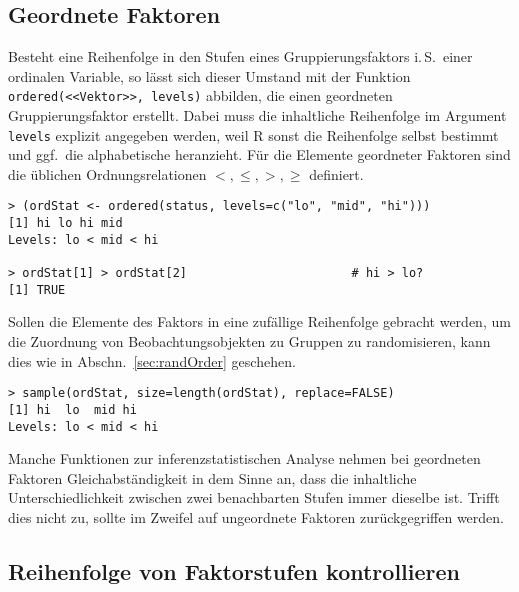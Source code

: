 \subsection{Geordnete Faktoren}
\label{sec:facOrder}

Besteht eine Reihenfolge in den Stufen eines Gruppierungsfaktors i.\,S.\ einer ordinalen Variable, so lässt sich dieser Umstand mit der Funktion \lstinline!ordered(<<Vektor>>, levels)! abbilden, die einen geordneten Gruppierungsfaktor erstellt. Dabei muss die inhaltliche Reihenfolge im Argument \lstinline!levels! explizit angegeben werden, weil R sonst die Reihenfolge selbst bestimmt und ggf.\ die alphabetische heranzieht. Für die Elemente geordneter Faktoren sind die üblichen Ordnungsrelationen $<, \leq, >, \geq$ definiert.
\begin{lstlisting}
> (ordStat <- ordered(status, levels=c("lo", "mid", "hi")))
[1] hi lo hi mid
Levels: lo < mid < hi

> ordStat[1] > ordStat[2]                       # hi > lo?
[1] TRUE
\end{lstlisting}

Sollen die Elemente des Faktors in eine zufällige Reihenfolge gebracht werden, um die Zuordnung von Beobachtungsobjekten zu Gruppen zu randomisieren, kann dies wie in Abschn.\ \ref{sec:randOrder} geschehen.
\begin{lstlisting}
> sample(ordStat, size=length(ordStat), replace=FALSE)
[1] hi  lo  mid hi 
Levels: lo < mid < hi
\end{lstlisting}

Manche Funktionen zur inferenzstatistischen Analyse nehmen bei geordneten Faktoren Gleichabständigkeit in dem Sinne an, dass die inhaltliche Unterschiedlichkeit zwischen zwei benachbarten Stufen immer dieselbe ist. Trifft dies nicht zu, sollte im Zweifel auf ungeordnete Faktoren zurückgegriffen werden.

\subsection{Reihenfolge von Faktorstufen kontrollieren}
\label{sec:facLabelOrder}

